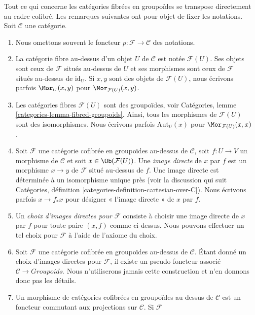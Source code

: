 \begin{remarks}
\label{remarks-cofibered-groupoids}
Tout ce qui concerne les catégories fibrées en groupoïdes se transpose
directement au cadre cofibré. Les remarques suivantes ont pour objet de fixer
les notations. Soit $\mathcal{C}$ une catégorie.
\begin{enumerate}
\item Nous omettons souvent le foncteur $p: \mathcal{F} \to \mathcal{C}$ des
notations.
\item La catégorie fibre au-dessus d'un objet $U$ de $\mathcal{C}$ est notée
$\mathcal{F}(U)$. Ses objets sont ceux de $\mathcal{F}$ situés au-dessus de $U$
et ses morphismes sont ceux de $\mathcal{F}$ situés au-dessus de $\text{id}_U$.
Si $x, y$ sont des objets de $\mathcal{F}(U)$, nous écrivons parfois
$\Mor_U(x, y)$ pour $\Mor_{\mathcal{F}(U)}(x, y)$.
\item Les catégories fibres $\mathcal{F}(U)$ sont des groupoïdes, voir
Catégories, lemme \ref{categories-lemma-fibred-groupoids}.
Ainsi, tous les morphismes de $\mathcal{F}(U)$ sont des isomorphismes.
Nous écrivons parfois $\text{Aut}_U(x)$ pour $\Mor_{\mathcal{F}(U)}(x, x)$.
\item
\label{item-pushforward}
Soit $\mathcal{F}$ une catégorie cofibrée en groupoïdes au-dessus de
$\mathcal{C}$, soit $f: U \to V$ un morphisme de $\mathcal{C}$ et
soit $x \in \Ob(\mathcal{F}(U))$.
Une {\it image directe} de $x$ par $f$ est un morphisme
$x \to y$ de $\mathcal{F}$ situé au-dessus de $f$. Une image directe
est déterminée à un isomorphisme unique près (voir la discussion qui suit
Catégories, définition \ref{categories-definition-cartesian-over-C}).
Nous écrivons parfois $x \to f_*x$ pour désigner « l'image directe » de $x$
par $f$.
\item Un {\it choix d'images directes pour $\mathcal{F}$} consiste à choisir
une image directe de $x$ par $f$ pour toute paire $(x, f)$ comme ci-dessus. Nous
pouvons effectuer un tel choix pour $\mathcal{F}$ à l'aide de l'axiome du choix.
\item Soit $\mathcal{F}$ une catégorie cofibrée en groupoïdes au-dessus de
$\mathcal{C}$. Étant donné un choix d'images directes pour $\mathcal{F}$, il
existe un pseudo-foncteur associé $\mathcal{C} \to \textit{Groupoids}$.
Nous n'utiliserons jamais cette construction et n'en donnons donc pas les détails.
\item
\label{item-cofibered-morphism}
Un morphisme de catégories cofibrées en groupoïdes au-dessus de $\mathcal{C}$
est un foncteur commutant aux projections sur $\mathcal{C}$. Si $\mathcal{F}$

\end{enumerate}
\end{remarks}
